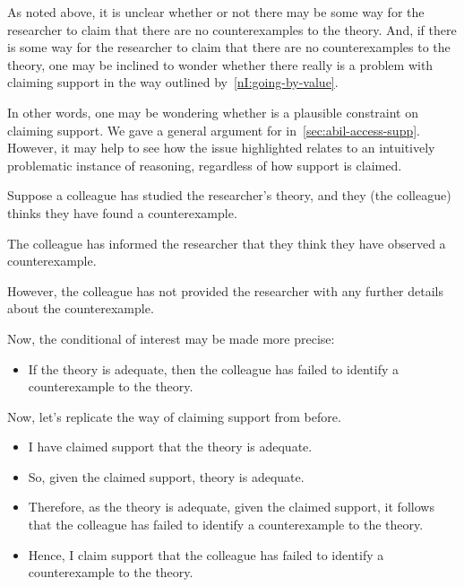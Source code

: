 \begin{note}
  As noted above, it is unclear whether or not there may be some way for the researcher to claim that there are no counterexamples to the theory.
  And, if there is some way for the researcher to claim that there are no counterexamples to the theory, one may be inclined to wonder whether there really is a problem with claiming support in the way outlined by~\ref{nI:going-by-value}.

  In other words, one may be wondering whether \eiS{} is a plausible constraint on claiming support.
  We gave a general argument for \eiS{} in~\autoref{sec:abil-access-supp}.
  However, it may help to see how the issue highlighted relates to an intuitively problematic instance of reasoning, regardless of how support is claimed.

  \begin{illustration}\label{ill:CE:colleague}
    Suppose a colleague has studied the researcher's theory, and they (the colleague) thinks they have found a counterexample.

    The colleague has informed the researcher that they think they have observed a counterexample.

    However, the colleague has not provided the researcher with any further details about the counterexample.

    Now, the conditional of interest may be made more precise:
    \begin{itemize}
    \item If the theory is adequate, then the colleague has failed to identify a counterexample to the theory.
    \end{itemize}

    Now, let's replicate the way of claiming support from before.

    \begin{itemize}
    \item I have claimed support that the theory is adequate.
    \item So, given the claimed support, theory is adequate.
    \item Therefore, as the theory is adequate, given the claimed support, it follows that the colleague has failed to identify a counterexample to the theory.
    \item Hence, I claim support that the colleague has failed to identify a counterexample to the theory.
    \end{itemize}


\end{illustration}
\end{note}
